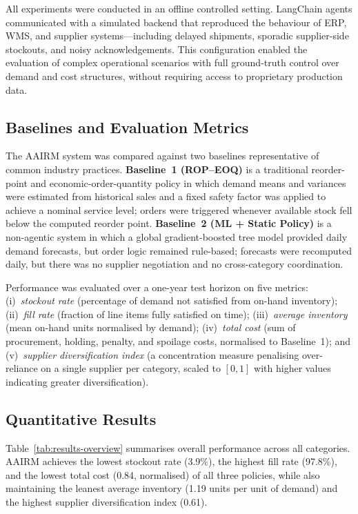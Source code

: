 \documentclass[utf8]{FrontiersinHarvard}
\begin{document}
	All experiments were conducted in an offline controlled setting.  LangChain
	agents communicated with a simulated backend that reproduced the behaviour
	of ERP, WMS, and supplier systems---including delayed shipments, sporadic
	supplier-side stockouts, and noisy acknowledgements.  This configuration
	enabled the evaluation of complex operational scenarios with full
	ground-truth control over demand and cost structures, without requiring
	access to proprietary production data.

	\subsection{Baselines and Evaluation Metrics}

	The AAIRM system was compared against two baselines representative of
	common industry practices.  \textbf{Baseline~1 (ROP--EOQ)} is a traditional
	reorder-point and economic-order-quantity policy in which demand means and
	variances were estimated from historical sales and a fixed safety factor
	was applied to achieve a nominal service level; orders were triggered
	whenever available stock fell below the computed reorder point.
	\textbf{Baseline~2 (ML + Static Policy)} is a non-agentic system in which
	a global gradient-boosted tree model provided daily demand forecasts, but
	order logic remained rule-based; forecasts were recomputed daily, but there
	was no supplier negotiation and no cross-category coordination.

	Performance was evaluated over a one-year test horizon on five metrics:
	(i)~\emph{stockout rate} (percentage of demand not satisfied from on-hand
	inventory); (ii)~\emph{fill rate} (fraction of line items fully satisfied
	on time); (iii)~\emph{average inventory} (mean on-hand units normalised by
	demand); (iv)~\emph{total cost} (sum of procurement, holding, penalty, and
	spoilage costs, normalised to Baseline~1); and (v)~\emph{supplier
	diversification index} (a concentration measure penalising over-reliance
	on a single supplier per category, scaled to $[0,1]$ with higher values
	indicating greater diversification).

	\subsection{Quantitative Results}

	Table~\ref{tab:results-overview} summarises overall performance across all
	categories.  AAIRM achieves the lowest stockout rate (3.9\%), the highest
	fill rate (97.8\%), and the lowest total cost (0.84, normalised) of all
	three policies, while also maintaining the leanest average inventory (1.19
	units per unit of demand) and the highest supplier diversification index
	(0.61).
\end{document}
